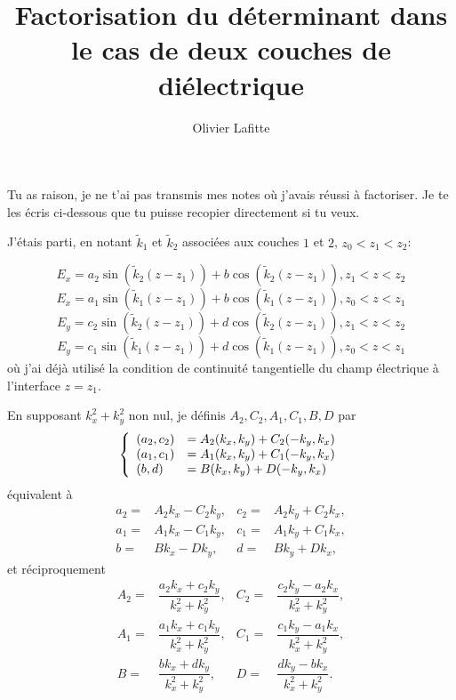 \documentclass{amsart}
\begin{document}
\title{Factorisation du déterminant dans le cas de deux couches de diélectrique}


\author{Olivier Lafitte}
\address{LAGA, Institut Galil\'ee\\
Universit\'e Paris 13\\
Sorbonne Paris Cit\'e
99, avenue J.B. Cl\'ement\\
93430 Villetaneuse \\
France}
 

Tu as raison, je ne t'ai pas transmis mes notes où j'avais réussi à factoriser. Je te les écris ci-dessous que tu puisse recopier directement si tu veux.

\newcommand{\kk}{\tilde{k}}
\renewcommand{\frac}{\dfrac}

J'étais parti, en notant \(\kk_1\) et \(\kk_2\) associées aux couches \(1\) et \(2\), \(z_0<z_1<z_2\):

\[E_x=a_2\sin(\kk_2(z-z_1))+b\cos(\kk_2(z-z_1)), z_1<z<z_2\]
\[E_x=a_1\sin(\kk_1(z-z_1))+b\cos(\kk_1(z-z_1)), z_0<z<z_1\]
\[E_y=c_2\sin(\kk_2(z-z_1))+d\cos(\kk_2(z-z_1)), z_1<z<z_2\]
\[E_y=c_1\sin(\kk_1(z-z_1))+d\cos(\kk_1(z-z_1)), z_0<z<z_1\]
où j'ai déjà utilisé la condition de continuité tangentielle du champ électrique à l'interface \(z=z_1\).

En supposant \(k_x^2 + k_y^2\) non nul, je définis \(A_2,C_2, A_1, C_1, B, D\) par
\[
\left\{
\begin{array}{ll}
(a_2,c_2)&=A_2(k_x,k_y)+C_2(-k_y,k_x)
\cr
(a_1,c_1)&=A_1(k_x,k_y)+C_1(-k_y,k_x)
\cr
(b,d)&=B(k_x,k_y)+D(-k_y,k_x)
\end{array}
\right.
\]
équivalent à
\begin{align*}
a_2 ={}& A_2k_x - C_2k_y, & c_2 ={}& A_2k_y + C_2 k_x,
\\
a_1 ={}& A_1k_x - C_1k_y, & c_1 ={}& A_1k_y + C_1 k_x,
\\
b ={}& Bk_x - Dk_y, & d ={}& Bk_y + D k_x,
\end{align*}
et réciproquement
\begin{align*}
A_2 ={}& \frac{a_2 k_x + c_2 k_y}{k_x^2 + k_y^2}, & C_2 ={}& \frac{c_2 k_y - a_2 k_x}{k_x^2 + k_y^2},
\\
A_1 ={}& \frac{a_1 k_x + c_1 k_y}{k_x^2 + k_y^2}, & C_1 ={}& \frac{c_1 k_y - a_1 k_x}{k_x^2 + k_y^2},
\\
B ={}& \frac{b k_x + d k_y}{k_x^2 + k_y^2}, & D ={}& \frac{d k_y - b k_x}{k_x^2 + k_y^2}.
\end{align*}
\end{document}
